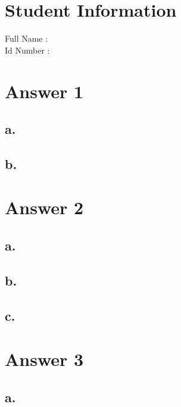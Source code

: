 \documentclass[12pt]{article}
\begin{document}
\section*{Student Information } 
Full Name :  \\
Id Number :  \\

\section*{Answer 1}

\subsection*{a.}

\subsection*{b.}





\section*{Answer 2}

\subsection*{a.}

\subsection*{b.}

\subsection*{c.}






\section*{Answer 3}

\subsection*{a.}
\end{document}
